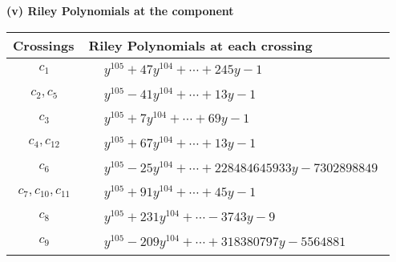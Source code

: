 \documentclass[1p]{elsarticle_modified}
\theoremstyle{definition}
\begin{document}
\newpage\renewcommand{\arraystretch}{1}
\flushleft \textbf{(v) Riley Polynomials at the component}\newline \\
\begin{tabular}{m{50pt}|m{274pt}}
Crossings & \hspace{64pt}Riley Polynomials at each crossing \\
\hline $$\begin{aligned}c_{1}\end{aligned}$$&$\begin{aligned}
&y^{105}+47 y^{104}+\cdots+245 y-1
\end{aligned}$\\
\hline $$\begin{aligned}c_{2},c_{5}\end{aligned}$$&$\begin{aligned}
&y^{105}-41 y^{104}+\cdots+13 y-1
\end{aligned}$\\
\hline $$\begin{aligned}c_{3}\end{aligned}$$&$\begin{aligned}
&y^{105}+7 y^{104}+\cdots+69 y-1
\end{aligned}$\\
\hline $$\begin{aligned}c_{4},c_{12}\end{aligned}$$&$\begin{aligned}
&y^{105}+67 y^{104}+\cdots+13 y-1
\end{aligned}$\\
\hline $$\begin{aligned}c_{6}\end{aligned}$$&$\begin{aligned}
&y^{105}-25 y^{104}+\cdots+228484645933 y-7302898849
\end{aligned}$\\
\hline $$\begin{aligned}c_{7},c_{10},c_{11}\end{aligned}$$&$\begin{aligned}
&y^{105}+91 y^{104}+\cdots+45 y-1
\end{aligned}$\\
\hline $$\begin{aligned}c_{8}\end{aligned}$$&$\begin{aligned}
&y^{105}+231 y^{104}+\cdots-3743 y-9
\end{aligned}$\\
\hline $$\begin{aligned}c_{9}\end{aligned}$$&$\begin{aligned}
&y^{105}-209 y^{104}+\cdots+318380797 y-5564881
\end{aligned}$\\
\hline
\end{tabular}\\~\\
\end{document}
